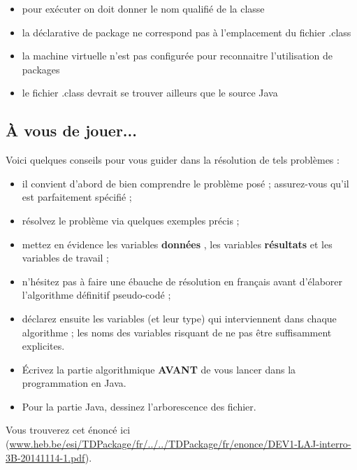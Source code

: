 \documentclass[11pt,a4paper]{article}
\begin{document}
            \par
        
            \begin{itemize} 
        
            \item[ \ding{"6D} ] pour ex\'ecuter on doit donner le nom qualifi\'e de la classe
        
            \item[ \ding{"6D} ] la d\'eclarative de package ne correspond pas \`a l'emplacement du fichier .class
        
            \item[ \ding{"6D} ] la machine virtuelle n'est pas configur\'ee pour reconnaitre l'utilisation de packages
        
            \item[ \ding{"6D} ] le fichier .class devrait se trouver ailleurs que le source Java
        
            \end{itemize} 
        \subsection{\`A vous de jouer...}
          Voici quelques conseils pour vous guider dans la r\'esolution de tels probl\`emes :
          
					\begin{itemize}
				
			\item il convient d'abord de bien comprendre le probl\`eme pos\'e ; assurez-vous qu'il est parfaitement sp\'ecifi\'e ;
			\item r\'esolvez le probl\`eme via quelques exemples pr\'ecis ;
			\item mettez en \'evidence les variables \textbf{\guillemotleft  donn\'ees \guillemotright }, les variables \textbf{\guillemotleft  r\'esultats \guillemotright } et les variables de travail ;
			\item n'h\'esitez pas \`a faire une \'ebauche de r\'esolution en fran\c cais avant d'\'elaborer l'algorithme d\'efinitif pseudo-cod\'e ;
			\item d\'eclarez ensuite les variables (et leur type) qui interviennent dans chaque algorithme ; les noms des variables risquant de ne pas \^etre suffisamment explicites.
			\item \'Ecrivez la partie algorithmique \textbf{AVANT} de vous lancer dans la programmation en Java.
			\item Pour la partie Java, dessinez l'arborescence des fichier. 
					\end{itemize}
				
            \par
        
          Vous trouverez cet \'enonc\'e ici (\url{www.heb.be/esi/TDPackage/fr/../../TDPackage/fr/enonce/DEV1-LAJ-interro-3B-20141114-1.pdf}).
        
            \par
        
				
\end{document}
